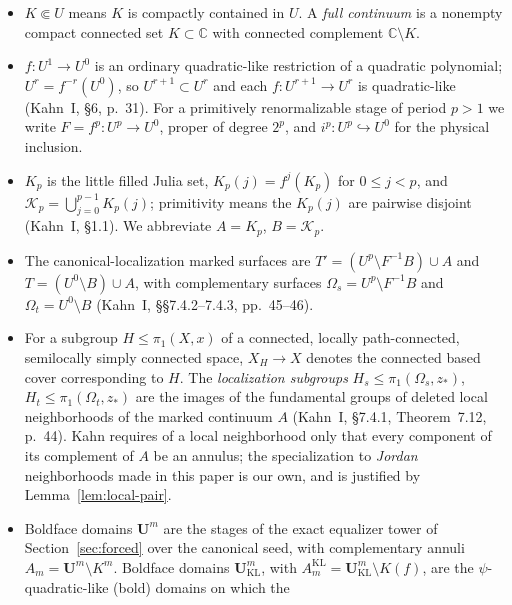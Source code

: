 \documentclass[11pt,reqno]{amsart}
\theoremstyle{definition}
\theoremstyle{remark}
\begin{document}
\begin{itemize}
\item \(K\Subset U\) means \(K\) is compactly contained in \(U\).  A
      \emph{full continuum} is a nonempty compact connected set
      \(K\subset\mathbb C\) with connected complement
      \(\mathbb C\setminus K\).
\item \(f:U^1\to U^0\) is an ordinary quadratic-like restriction of a
      quadratic polynomial; \(U^r=f^{-r}(U^0)\), so
      \(U^{r+1}\subset U^r\) and each \(f:U^{r+1}\to U^r\) is
      quadratic-like (Kahn~I, \S6, p.~31).  For a
      primitively renormalizable stage of period \(p>1\) we write
      \(F=f^p:U^p\to U^0\), proper of degree \(2^p\), and
      \(i^p:U^p\hookrightarrow U^0\) for the physical inclusion.
\item \(K_p\) is the little filled Julia set, \(K_p(j)=f^j(K_p)\) for
      \(0\le j<p\), and \(\mathcal K_p=\bigcup_{j=0}^{p-1}K_p(j)\);
      primitivity means the \(K_p(j)\) are pairwise disjoint (Kahn~I,
      \S1.1).  We abbreviate \(A=K_p\),
      \(B=\mathcal K_p\).
\item The canonical-localization marked surfaces are
      \(T'=(U^p\setminus F^{-1}B)\cup A\) and
      \(T=(U^0\setminus B)\cup A\), with complementary surfaces
      \(\Omega_s=U^p\setminus F^{-1}B\) and
      \(\Omega_t=U^0\setminus B\)
      (Kahn~I, \S\S7.4.2--7.4.3, pp.~45--46).
\item For a subgroup \(H\le\pi_1(X,x)\) of a connected, locally
      path-connected, semilocally simply connected space, \(X_H\to X\)
      denotes the connected based cover corresponding to \(H\).  The
      \emph{localization subgroups}
      \(H_s\le\pi_1(\Omega_s,z_*)\), \(H_t\le\pi_1(\Omega_t,z_*)\) are
      the images of the fundamental groups of deleted local
      neighborhoods of the marked continuum \(A\)
      (Kahn~I, \S7.4.1, Theorem~7.12, p.~44).  Kahn requires of a local
      neighborhood only that every component of its complement of \(A\)
      be an annulus; the specialization to \emph{Jordan} neighborhoods
      made in this paper is our own, and is justified by
      Lemma~\ref{lem:local-pair}.
\item Boldface domains \(\mathbf U^m\) are the stages of the exact
      equalizer tower of Section~\ref{sec:forced} over the canonical
      seed, with complementary annuli
      \(A_m=\mathbf U^m\setminus K^m\).  Boldface domains
      \(\mathbf U_{\mathrm{KL}}^m\), with
      \(A^{\mathrm{KL}}_m=\mathbf U_{\mathrm{KL}}^m\setminus K(f)\),
      are the \(\psi\)-quadratic-like (bold) domains on which the

\end{itemize}
\end{document}
